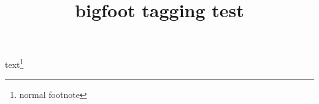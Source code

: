 \documentclass{article}
\title{bigfoot tagging test}
\begin{document}
text\footnote{normal footnote}
\end{document}

